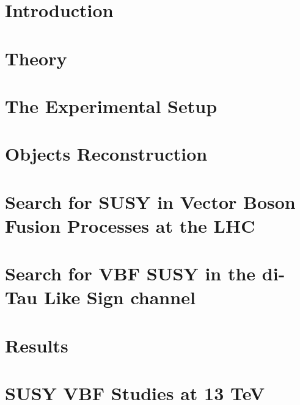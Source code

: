 \documentclass[
twoside=false,
headsepline,     %
headings=normal,
open=any,
numbers=noenddot, %
numbering %
]{scrreprt} %
\begin{document}
\setcounter{page}{1}
\tableofcontents

\cleardoublepage

\setcounter{page}{1}


\chapter{Introduction}
\label{sec:introduction}

\cleardoublepage

\chapter{Theory}
\label{sec:theory}

\cleardoublepage

\chapter{The Experimental Setup}
\label{sec:detector}

\cleardoublepage

\chapter{Objects Reconstruction}
\label{sec:obj_reco}

\cleardoublepage

\chapter{Search for SUSY in Vector Boson Fusion Processes at the LHC}
\label{sec:VBFSUSY}

\cleardoublepage

\chapter{Search for VBF SUSY in the di-Tau Like Sign channel}
\label{sec:analysis}

\cleardoublepage

\chapter{Results}
\label{sec:results}

\cleardoublepage

\chapter{SUSY VBF Studies at 13 TeV}
\label{sec:13TeVanalysis}

\cleardoublepage
\end{document}
